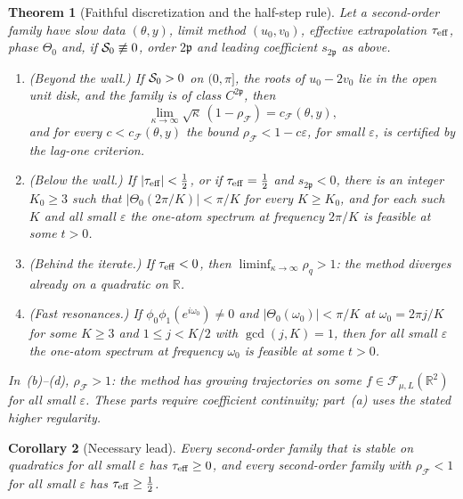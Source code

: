 \documentclass[11pt]{article}
\newtheorem{theorem}{Theorem}[section]
\newtheorem{corollary}[theorem]{Corollary}
\theoremstyle{definition}
\theoremstyle{remark}
\newcommand{\R}{\mathbb R}
\newcommand{\cF}{\mathcal F}
\newcommand{\rhoF}{\rho_{\cF}}
\newcommand{\cFF}{c_{\cF}}
\newcommand{\teff}{\tau_{\rm eff}}
\begin{document}
\begin{samepage}
\begin{theorem}[Faithful discretization and the half-step rule]\label{thm:faithful}
Let a second-order family have slow data \((\theta,y)\), limit method \((u_0,v_0)\), effective
extrapolation \(\teff\), phase \(\Theta_0\) and, if \(\mathcal S_0\not\equiv0\), order \(2\mathfrak p\) and leading coefficient \(s_{2\mathfrak p}\) as above.
\begin{enumerate}[label=\textup{(\alph*)}]
\item \textup{(Beyond the wall.)}  If \(\mathcal S_0>0\) on \((0,\pi]\), the roots of \(u_0-2v_0\) lie in the open unit
disk, and the family is of class \(C^{2\mathfrak p}\), then
\[
\lim_{\kappa\to\infty}\sqrt\kappa\,(1-\rhoF)=\cFF(\theta,y),
\]
and for every \(c<\cFF(\theta,y)\) the bound \(\rhoF<1-c\varepsilon\), for small \(\varepsilon\), is certified by the
lag-one criterion.
\item \textup{(Below the wall.)}  If \(|\teff|<\frac12\), or if \(\teff=\frac12\) and \(s_{2\mathfrak p}<0\), there is an integer \(K_0\ge3\)
such that \(|\Theta_0(2\pi/K)|<\pi/K\) for every \(K\ge K_0\), and for each such \(K\) and all small \(\varepsilon\) the one-atom
spectrum at frequency \(2\pi/K\) is feasible at some \(t>0\).
\item \textup{(Behind the iterate.)}  If \(\teff<0\), then \(\liminf_{\kappa\to\infty}\rho_q>1\): the method diverges already on a
quadratic on \(\R\).
\item \textup{(Fast resonances.)}  If \(\phi_0\phi_1(e^{i\omega_0})\ne0\) and \(|\Theta_0(\omega_0)|<\pi/K\) at \(\omega_0=2\pi j/K\) for some \(K\ge3\) and \(1\le j<K/2\)
with \(\gcd(j,K)=1\), then for all small \(\varepsilon\) the one-atom spectrum at frequency \(\omega_0\) is feasible at some \(t>0\).
\end{enumerate}
In~(b)--(d), \(\rhoF>1\): the method has growing trajectories on some \(f\in\cF_{\mu,L}(\R^2)\) for all small
\(\varepsilon\).  These parts require coefficient continuity; part~(a) uses the stated higher regularity.
\end{theorem}
\end{samepage}

\begin{corollary}[Necessary lead]\label{cor:lead}
Every second-order family that is stable on quadratics for all small \(\varepsilon\) has \(\teff\ge0\), and every
second-order family with \(\rhoF<1\) for all small \(\varepsilon\) has \(\teff\ge\frac12\).
\end{corollary}
\end{document}
